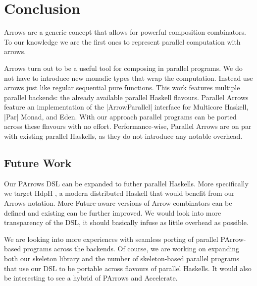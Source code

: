 
\section{Conclusion}
\label{sec:conclusion}
Arrows are a generic concept that allows for powerful composition combinators. To our knowledge we are the first ones to represent parallel computation with arrows. \done

Arrows turn out to be a useful tool for composing in parallel programs. We do not have to introduce new monadic types that wrap the computation. Instead use arrows just like regular sequential pure functions. 
%
This work features multiple parallel backends: the already available parallel Haskell flavours. Parallel Arrows feature an implementation of the |ArrowParallel| interface for Multicore Haskell, |Par| Monad, and Eden. With our approach parallel programs can be ported across these flavours with no effort.
%
%
Performance-wise, Parallel Arrows are on par with existing parallel Haskells, as they do not introduce any notable overhead.





\subsection{Future Work}
\label{sec:future-work}

Our PArrows DSL can be expanded to futher parallel Haskells. More specifically we target HdpH \cite{Maier:2014:HDS:2775050.2633363}, a modern distributed Haskell that would benefit from our Arrows notation. More Future-aware versions of Arrow combinators can be defined and existing can be further improved. We would look into more transparency of the DSL, it should basically infuse as little overhead as possible.

We are looking into more experiences with seamless porting of parallel PArrow-based programs across the backends.
Of course, we are working on expanding both our skeleton library and the number of skeleton-based parallel programs that use our DSL to be portable across flavours of parallel Haskells.
It would also be interesting to see a hybrid of PArrows and Accelerate.

